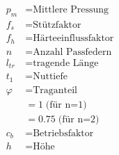    \begin{scriptsize}
    \begin{minipage}{0.5\linewidth}
        \begin{center}
           \begin{align*}
               p_m &= \text{Mittlere Pressung}
               \\f_s &= \text{Stützfaktor}
               \\f_h &= \text{Härteeinflussfaktor}
               \\n &= \text{Anzahl Passfedern}
               \\l_{tr}&= \text{tragende Länge}
               \\t_1 &= \text{Nuttiefe}
               \\\varphi &= \text{Traganteil} 
               \\ &= 1 \; \text{(für n=1)}
               \\ &= 0.75 \; \text{(für n=2)}
               \\c_b &= \text{Betriebsfaktor}
               \\h &= \text{Höhe}
            \end{align*}
        \end{center}
   \end{minipage}
   \end{scriptsize}
   \begin{footnotesize}
   \end{footnotesize}
